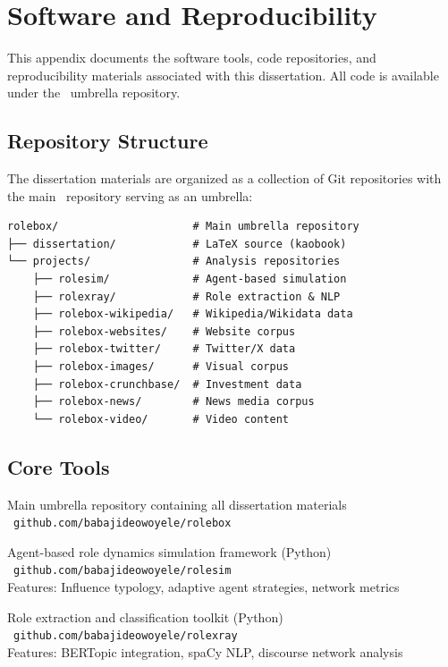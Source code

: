 \documentclass[../main.tex]{subfiles}
\begin{document}
\chapter{Software and Reproducibility}

This appendix documents the software tools, code repositories, and reproducibility materials associated with this dissertation. All code is available under the \RoleBox\ umbrella repository.

\section{Repository Structure}

The dissertation materials are organized as a collection of Git repositories with the main \RoleBox\ repository serving as an umbrella:

\begin{kaobox}[frametitle=Repository Architecture]
\begin{verbatim}
rolebox/                     # Main umbrella repository
├── dissertation/            # LaTeX source (kaobook)
└── projects/                # Analysis repositories
    ├── rolesim/             # Agent-based simulation
    ├── rolexray/            # Role extraction & NLP
    ├── rolebox-wikipedia/   # Wikipedia/Wikidata data
    ├── rolebox-websites/    # Website corpus
    ├── rolebox-twitter/     # Twitter/X data
    ├── rolebox-images/      # Visual corpus
    ├── rolebox-crunchbase/  # Investment data
    ├── rolebox-news/        # News media corpus
    └── rolebox-video/       # Video content
\end{verbatim}
\end{kaobox}

\section{Core Tools}

\begin{description}[leftmargin=0.5cm]

\item[\RoleBox] Main umbrella repository containing all dissertation materials\\
\faGithub\ \texttt{github.com/babajideowoyele/rolebox}

\item[\RoleSim] Agent-based role dynamics simulation framework (Python)\\
\faGithub\ \texttt{github.com/babajideowoyele/rolesim}\\
Features: Influence typology, adaptive agent strategies, network metrics

\item[RoleXray] Role extraction and classification toolkit (Python)\\
\faGithub\ \texttt{github.com/babajideowoyele/rolexray}\\
Features: BERTopic integration, spaCy NLP, discourse network analysis

\end{description}
\end{document}

